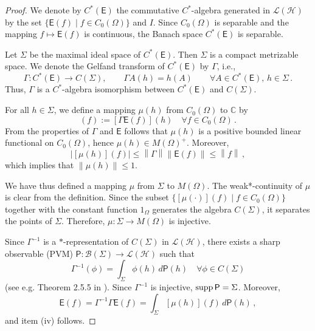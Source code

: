 \documentclass[12pt]{amsart}
\theoremstyle{definition}
\newcommand{\C}{\mathbb C} %
\newcommand{\lh}{\mathcal{L(H)}} %
\newcommand{\no}[1]{\left\|#1\right\|} %
\newcommand{\Eo}{\mathsf{E}} %
\newcommand{\PP}{\mathsf{P}} %
\newcommand{\bor}[1]{\mathcal{B}(#1)} %
\newcommand{\supp}{{\rm supp}\,}
\newcommand{\de}{\, d}
\newcommand{\frecc}{\rightarrow}
\begin{document}
\begin{proof}
We denote by $C^\ast (\Eo)$ the commutative $C^\ast$-algebra generated in $\lh$ by the set $\{ \Eo (f) \mid f\in C_0 (\Omega) \}$ and $I$. Since $C_0 (\Omega)$ is separable and the mapping $f\mapsto \Eo (f)$ is continuous, the Banach space $C^\ast (\Eo)$ is separable.

Let $\Sigma$ be the maximal ideal space of $C^\ast (\Eo)$. Then $\Sigma$ is a compact metrizable space. We denote the Gelfand transform of $C^\ast (\Eo)$ by $\Gamma$, i.e.,
\begin{equation*}
\Gamma : C^\ast (\Eo) \frecc C(\Sigma), \qquad \Gamma A (h) =
h(A) \qquad \forall A \in C^\ast (\Eo), \, h\in\Sigma \, .
\end{equation*}
Thus, $\Gamma$ is a $C^\ast$-algebra isomorphism
between $C^\ast (\Eo)$ and $C(\Sigma)$.

For all $h\in\Sigma$, we define a mapping $\mu(h)$ from $C_0 (\Omega)$  to $\C$ by
\begin{equation*}
[\mu(h)] (f) := [\Gamma \Eo (f)] (h) \quad \forall f\in C_0 (\Omega) \, .
\end{equation*}
From the properties of $\Gamma$ and $\Eo$ follows that $\mu(h)$ is a positive bounded linear functional on $C_0 (\Omega)$,
hence $\mu (h) \in M(\Omega)^+$. Moreover,
\begin{equation*}
\left| [\mu(h)] (f) \right| \leq \no{\Gamma}
\no{\Eo (f)} \leq \no{f} \, ,
\end{equation*}
which implies that $\no{\mu(h)} \leq 1$.

We have thus defined a mapping $\mu$ from $\Sigma$ to $M(\Omega)$.
The weak*-continuity of $\mu$ is clear from the definition. Since the subset
$\{ [\mu(\cdot)] (f) \mid f\in C_0 (\Omega) \}$ together with the constant function $1_{\Omega}$ generates the algebra $C(\Sigma)$, it separates the points of $\Sigma$. Therefore, $\mu : \Sigma \frecc M(\Omega)$ is injective.

Since $\Gamma^{-1}$ is a $\ast$-representation of $C(\Sigma)$ in $\lh$, there exists a sharp observable (PVM) $\PP : \bor{\Sigma} \frecc \lh$ such that
\begin{equation*}
\Gamma^{-1} (\phi) = \int_\Sigma \phi (h) \de \PP (h) \quad \forall \phi \in C(\Sigma)
\end{equation*}
(see e.g. Theorem 2.5.5 in \cite{CAOT89}).
Since $\Gamma^{-1}$ is injective, $\supp \PP = \Sigma$.
Moreover,
\begin{equation*}
\Eo(f) = \Gamma^{-1} \Gamma \Eo (f) = \int_\Sigma [\mu (h)] (f) \de \PP (h) \, ,
\end{equation*}
and item {\rm (iv)} follows.


\end{proof}
\end{document}
